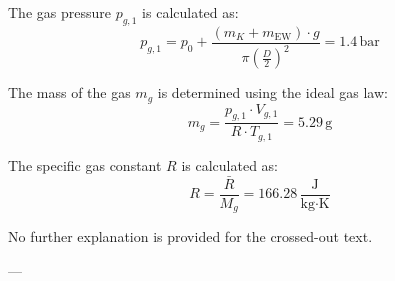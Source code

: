The gas pressure \( p_{g,1} \) is calculated as:  
\[
p_{g,1} = p_0 + \frac{(m_K + m_{\text{EW}}) \cdot g}{\pi \left( \frac{D}{2} \right)^2} = 1.4 \, \text{bar}
\]  

The mass of the gas \( m_g \) is determined using the ideal gas law:  
\[
m_g = \frac{p_{g,1} \cdot V_{g,1}}{R \cdot T_{g,1}} = 5.29 \, \text{g}
\]  

The specific gas constant \( R \) is calculated as:  
\[
R = \frac{\bar{R}}{M_g} = 166.28 \, \frac{\text{J}}{\text{kg·K}}
\]  

No further explanation is provided for the crossed-out text.  

---